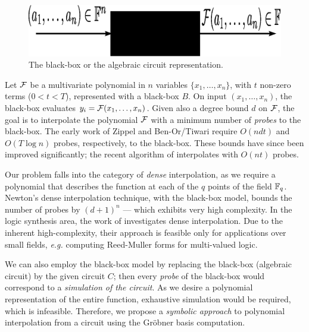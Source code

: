 \begin{figure}[hbt]
\centerline{
\includegraphics[scale=0.35]{../blackbox.eps}
}
\caption{The black-box or the algebraic circuit representation.}
\label{fig:blackbox}
\end{figure}

Let ${\mathcal{F}}$ be a multivariate polynomial in $n$ variables $\{x_1, \dots,
x_n\}$, with $t$ non-zero terms ($0 < t < T$), represented with a
black-box $B$. On input $(x_1, \dots, x_n)$,
the black-box evaluates $y_i = {\mathcal{F}}(x_1, \dots, x_n)$. Given also a
degree bound $d$ on ${\mathcal{F}}$, the goal is to interpolate the polynomial
${\mathcal{F}}$ with a minimum number of {\it probes} to the black-box. The early
work of Zippel \cite{zippel:interpolate} and
Ben-Or/Tiwari \cite{ben-or-tiwari:interpolate} require $O(ndt)$ and
$O(T \log n)$ probes, respectively, to the black-box. These bounds
have since been improved significantly; the recent algorithm of
\cite{monagan:interpolate} interpolates with $O(nt)$ probes.  

Our problem falls into the category of {\it dense} interpolation, as
we require a polynomial that describes the function at each of the $q$
points of the field ${\mathbb{F}}_{q}$. Newton's dense interpolation technique,
with the black-box model, bounds the number of probes by $(d+1)^n$ ---
which  exhibits very high complexity. In the logic synthesis area, the
work of \cite{zilic:interpolate} investigates dense interpolation. Due
to the inherent high-complexity, their approach is feasible only for
applications over small fields, {\it e.g.} computing  Reed-Muller
forms for multi-valued logic.  

We can also employ the black-box model by replacing the black-box
(algebraic circuit) by the given circuit $C$; then every {\it probe}
of the black-box would correspond to a {\it simulation of the
  circuit}. As we desire a polynomial representation of the entire
function, exhaustive simulation would be required, which is
infeasible. Therefore, we propose a {\it symbolic approach} to
polynomial interpolation from a circuit using the Gr\"obner basis
computation. 
